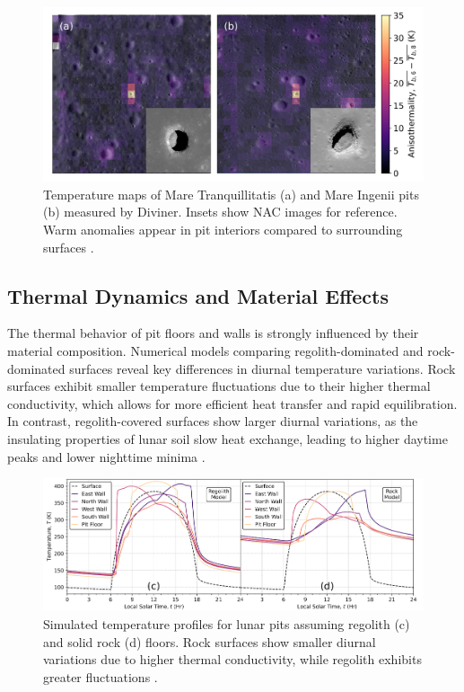 \begin{figure}[H]
    \centering
    \includegraphics[width=0.7\linewidth]{lunar-pits-temperature-LROC.png}
    \caption{Temperature maps of Mare Tranquillitatis (a) and Mare Ingenii pits (b) measured by Diviner. Insets show NAC images for reference. Warm anomalies appear in pit interiors compared to surrounding surfaces \cite{thermal-lunar-pits}.}
    \label{fig:lunar-pits-temperatures-LROC}
\end{figure}

\subsection{Thermal Dynamics and Material Effects}

The thermal behavior of pit floors and walls is strongly influenced by their material composition. Numerical models comparing regolith-dominated and rock-dominated surfaces reveal key differences in diurnal temperature variations. Rock surfaces exhibit smaller temperature fluctuations due to their higher thermal conductivity, which allows for more efficient heat transfer and rapid equilibration. In contrast, regolith-covered surfaces show larger diurnal variations, as the insulating properties of lunar soil slow heat exchange, leading to higher daytime peaks and lower nighttime minima \cite{thermal-lunar-pits, newer-thermal}.

\begin{figure}[H]
    \centering
    \includegraphics[width=0.9\linewidth]{lunar-pit-regolith-vs-stone-thermal.png}
    \caption{Simulated temperature profiles for lunar pits assuming regolith (c) and solid rock (d) floors. Rock surfaces show smaller diurnal variations due to higher thermal conductivity, while regolith exhibits greater fluctuations \cite{thermal-lunar-pits}.}
    \label{fig:regolith-vs-stone-thermal}
\end{figure}

